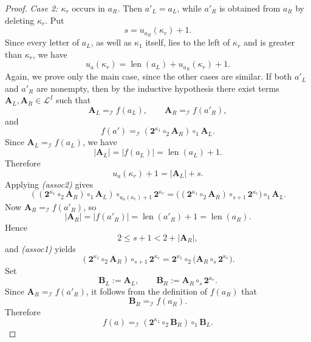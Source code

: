 \documentclass[10pt,a4paper]{amsart}
\renewcommand{\le}{\leqslant}\renewcommand{\ge}{\geqslant}
\begin{document}
\begin{proof}
\medskip
\noindent\emph{Case 2: \(\kappa_r\text{ occurs in } a_R\).} Then \(a'_L=a_L\), while \(a'_R\) is obtained from \(a_R\) by deleting
\(\kappa_r\). Put
\[
s=u_{a_R}(\kappa_r)+1.
\]
Since every letter of \(a_L\), as well as \(\kappa_1\) itself, lies to the left
of \(\kappa_r\) and is greater than \(\kappa_r\), we have
\[
u_a(\kappa_r)=\operatorname{len}(a_L)+u_{a_R}(\kappa_r)+1.
\]
Again, we prove only the main case, since the other cases are similar.
\smallskip
\noindent If both \(a'_L\) and \(a'_R\) are nonempty, then by the inductive
hypothesis there exist terms \(\mathbf A_L,\mathbf A_R\in\mathcal L^I\) such that
\[
\mathbf A_L =_{\mathcal I} f(a_L),\qquad \mathbf A_R =_{\mathcal I} f(a'_R),
\]
and
\[
f(a') =_{\mathcal I} (\mathbf 2^{\kappa_1}\circ_2 \mathbf A_R)\circ_1 \mathbf A_L.
\]
Since \(\mathbf A_L =_{\mathcal I} f(a_L)\), we have
\[
|\mathbf A_L|=|f(a_L)|=\operatorname{len}(a_L)+1.
\]
Therefore
\[
u_a(\kappa_r)+1=|\mathbf A_L|+s.
\]
Applying \emph{(assoc2)} gives
\[
((\mathbf 2^{\kappa_1}\circ_2 \mathbf A_R)\circ_1 \mathbf A_L)\circ_{u_a(\kappa_r)+1}\mathbf 2^{\kappa_r}
=
\bigl((\mathbf 2^{\kappa_1}\circ_2 \mathbf A_R)\circ_{s+1}\mathbf 2^{\kappa_r}\bigr)\circ_1 \mathbf A_L.
\]
Now \(\mathbf A_R =_{\mathcal I} f(a'_R)\), so
\[
|\mathbf A_R|=|f(a'_R)|=\operatorname{len}(a'_R)+1=\operatorname{len}(a_R).
\]
Hence
\[
2\le s+1<2+|\mathbf A_R|,
\]
and \emph{(assoc1)} yields
\[
(\mathbf 2^{\kappa_1}\circ_2 \mathbf A_R)\circ_{s+1}\mathbf 2^{\kappa_r}
=
\mathbf 2^{\kappa_1}\circ_2\bigl(\mathbf A_R\circ_s \mathbf 2^{\kappa_r}\bigr).
\]
Set
\[
\mathbf B_L:=\mathbf A_L,
\qquad
\mathbf B_R:=\mathbf A_R\circ_s \mathbf 2^{\kappa_r}.
\]
Since \(\mathbf A_R =_{\mathcal I} f(a'_R)\), it follows from the definition of \(f(a_R)\) that
\[
\mathbf B_R =_{\mathcal I} f(a_R).
\]
Therefore
\[
f(a)=_{\mathcal I}(\mathbf 2^{\kappa_1}\circ_2 \mathbf B_R)\circ_1 \mathbf B_L.
\]
\end{proof}
\end{document}
